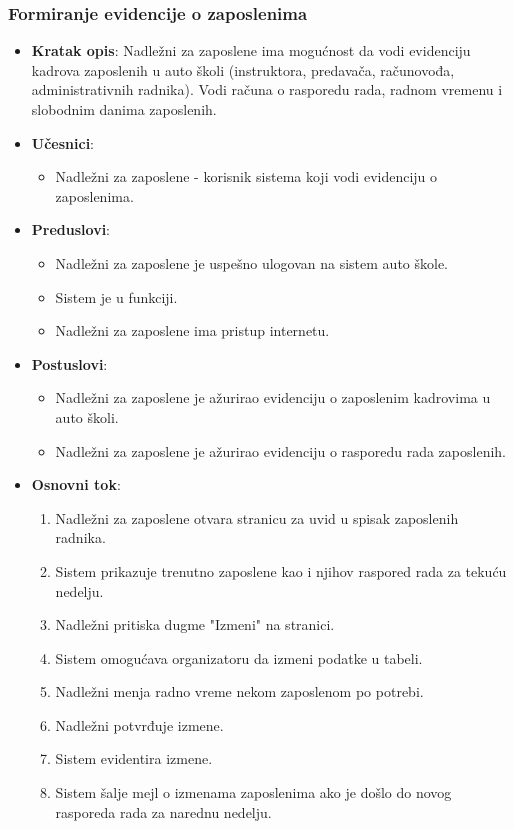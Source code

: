 \subsubsection{Formiranje evidencije o zaposlenima}
\label{subsubsec:vozni park}
\begin{itemize}
  \item \textbf{Kratak opis}: Nadležni za zaposlene ima mogućnost da vodi evidenciju kadrova zaposlenih u auto školi 
  (instruktora, predavača, računovođa, administrativnih radnika). Vodi računa o rasporedu rada, radnom vremenu i slobodnim danima zaposlenih.

  \item \textbf{Učesnici}:
    \begin{itemize}
    \item Nadležni za zaposlene - korisnik sistema koji vodi evidenciju o zaposlenima.
    \end{itemize}
  \item \textbf{Preduslovi}:
    \begin{itemize}
    \item  Nadležni za zaposlene je uspešno ulogovan na sistem auto škole.
    \item  Sistem je u funkciji.
    \item  Nadležni za zaposlene ima pristup internetu.
    \end{itemize}
  \item \textbf{Postuslovi}:
      \begin{itemize}
      \item  Nadležni za zaposlene je ažurirao evidenciju o zaposlenim kadrovima u auto školi.
      \item  Nadležni za zaposlene je ažurirao evidenciju o rasporedu rada zaposlenih.
      \end{itemize}
  \item \textbf{Osnovni tok}:
      \begin{enumerate}
        \item Nadležni za zaposlene otvara stranicu za uvid u spisak zaposlenih radnika.
        \item Sistem prikazuje trenutno zaposlene kao i njihov raspored rada za tekuću nedelju.
        \item Nadležni pritiska dugme "Izmeni" na stranici.
        \item Sistem omogućava organizatoru da izmeni podatke u tabeli.
        \item Nadležni menja radno vreme nekom zaposlenom po potrebi.
        \item Nadležni potvrđuje izmene.
        \item Sistem evidentira izmene.
        \item Sistem šalje mejl o izmenama zaposlenima ako je došlo do novog rasporeda rada za narednu nedelju.
      \end{enumerate}


\end{itemize}
